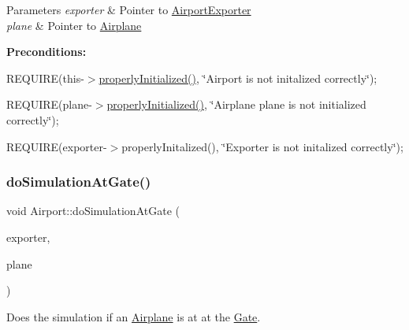 \begin{DoxyParams}{Parameters}
{\em exporter} & Pointer to \mbox{\hyperlink{class_airport_exporter}{Airport\+Exporter}} \\
\hline
{\em plane} & Pointer to \mbox{\hyperlink{class_airplane}{Airplane}}\\
\hline
\end{DoxyParams}
{\bfseries Preconditions\+:}
\begin{DoxyItemize}
\item R\+E\+Q\+U\+I\+RE(this-\/$>$\mbox{\hyperlink{class_airport_aa13e68ac58e8875837fbe888325cfff6}{properly\+Initialized()}}, \char`\"{}\+Airport is not initalized correctly\char`\"{});
\item R\+E\+Q\+U\+I\+RE(plane-\/$>$\mbox{\hyperlink{class_airport_aa13e68ac58e8875837fbe888325cfff6}{properly\+Initialized()}}, \char`\"{}\+Airplane \textquotesingle{}plane\textquotesingle{} is not initialized correctly\char`\"{});
\item R\+E\+Q\+U\+I\+RE(exporter-\/$>$properly\+Initalized(), \char`\"{}\+Exporter is not initalized correctly\char`\"{}); 
\end{DoxyItemize}\mbox{\label{class_airport_a28e88d341009ceb9e8b4287fb06db3c9}} 
\subsubsection{\texorpdfstring{do\+Simulation\+At\+Gate()}{doSimulationAtGate()}}
{\footnotesize\ttfamily void Airport\+::do\+Simulation\+At\+Gate (\begin{DoxyParamCaption}\item[{\mbox{\hyperlink{class_airport_exporter}{Airport\+Exporter}} $\ast$}]{exporter,  }\item[{\mbox{\hyperlink{class_airplane}{Airplane}} $\ast$}]{plane }\end{DoxyParamCaption})}



Does the simulation if an \mbox{\hyperlink{class_airplane}{Airplane}} is at at the \mbox{\hyperlink{class_gate}{Gate}}. 


